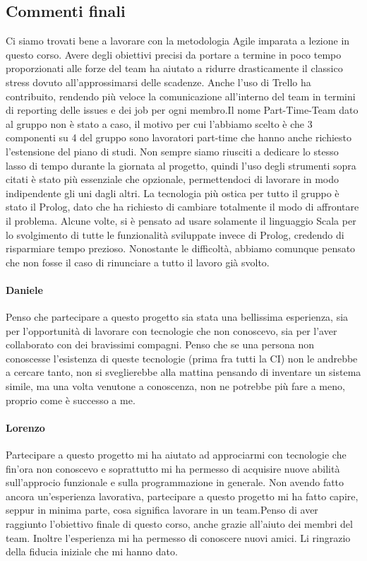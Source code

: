 \subsection{Commenti finali}
Ci siamo trovati bene a lavorare con la metodologia Agile imparata a lezione in questo corso. Avere degli obiettivi precisi da portare a termine in poco tempo proporzionati alle forze del team ha aiutato a ridurre drasticamente il classico stress dovuto all’approssimarsi delle scadenze. \newline \newline Anche l’uso di Trello ha contribuito, rendendo più veloce la comunicazione all’interno del team in termini di reporting delle issues e dei job per ogni membro.\newline \newline Il nome Part-Time-Team dato al gruppo non è stato a caso, il motivo per cui l’abbiamo scelto è che 3 componenti su 4 del gruppo sono lavoratori part-time che hanno anche richiesto l’estensione del piano di studi. Non sempre siamo riusciti a dedicare lo stesso lasso di tempo durante la giornata al progetto, quindi l’uso degli strumenti sopra citati è stato più essenziale che opzionale, permettendoci di lavorare in modo indipendente gli uni dagli altri. \newline \newline La tecnologia più ostica per tutto il gruppo è stato il Prolog, dato che ha richiesto di cambiare totalmente il modo di affrontare il problema. Alcune volte, si è pensato ad usare solamente il linguaggio Scala per lo svolgimento di tutte le funzionalità sviluppate invece di Prolog, credendo di risparmiare tempo prezioso. Nonostante le difficoltà, abbiamo comunque pensato che non fosse il caso di rinunciare a tutto il lavoro già svolto. 
\paragraph{Daniele}
Penso che partecipare a questo progetto sia stata una bellissima esperienza, sia per l’opportunità di lavorare con tecnologie che non conoscevo, sia per l’aver collaborato con dei bravissimi compagni. Penso che se una persona non conoscesse l’esistenza di queste tecnologie (prima fra tutti la CI) non le andrebbe a cercare tanto, non si sveglierebbe alla mattina pensando di inventare un sistema simile, ma una volta venutone a conoscenza, non ne potrebbe più fare a meno, proprio come è successo a me.
\paragraph{Lorenzo}
Partecipare a questo progetto mi ha aiutato ad approciarmi con tecnologie che fin'ora non conoscevo e soprattutto mi ha permesso di acquisire nuove abilità sull'approcio funzionale e sulla programmazione in generale. Non avendo fatto ancora un'esperienza lavorativa, partecipare a questo progetto mi ha fatto capire, seppur in minima parte, cosa significa lavorare in un team.\newline Penso di aver raggiunto l'obiettivo finale di questo corso, anche grazie all'aiuto dei membri del team. Inoltre l'esperienza mi ha permesso di conoscere nuovi amici. Li ringrazio della fiducia iniziale che mi hanno dato.
